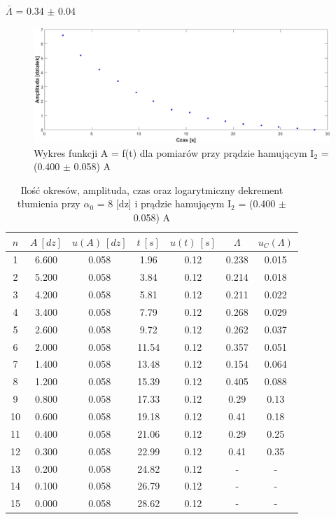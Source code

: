 \documentclass[12pt, a4paper, oneside]{article}
\begin{document}
\begin{center}
$\bar{\Lambda}$ = 0.34 $\pm$ 0.04
\end{center}
\clearpage
\begin{figure}[h]
\centering
\caption{Wykres funkcji A = f(t) dla pomiarów przy prądzie hamującym I$_2$ = (0.400 $\pm$ 0.058) A}
\includegraphics[scale=0.3]{f3.png}
\end{figure}
\begin{table}[h]
  \centering
  \caption{Ilość okresów, amplituda, czas oraz logarytmiczny dekrement tłumienia przy $\alpha_0$ = 8 [dz] i prądzie hamującym I$_2$ = (0.400 $\pm$ 0.058) A}
    \begin{tabular}{|c|c|c|c|c|c|c|}\hline
    $n$ & $A~[dz]$ & $u(A)~[dz]$ & $t~[s]$ & $u(t)~[s]$ & $\Lambda$ & $u_C(\Lambda)$ \\\hline
    1 & 6.600 & 0.058 & 1.96 & 0.12 & 0.238 & 0.015 \\\hline
    2 & 5.200 & 0.058 & 3.84 & 0.12 & 0.214 & 0.018 \\\hline
    3 & 4.200 & 0.058 & 5.81 & 0.12 & 0.211 & 0.022 \\\hline
    4 & 3.400 & 0.058 & 7.79 & 0.12 & 0.268 & 0.029 \\\hline
    5 & 2.600 & 0.058 & 9.72 & 0.12 & 0.262 & 0.037 \\\hline
    6 & 2.000 & 0.058 & 11.54 & 0.12 & 0.357 & 0.051 \\\hline
    7 & 1.400 & 0.058 & 13.48 & 0.12 & 0.154 & 0.064 \\\hline
    8 & 1.200 & 0.058 & 15.39 & 0.12 & 0.405 & 0.088 \\\hline
    9 & 0.800 & 0.058 & 17.33 & 0.12 & 0.29 & 0.13 \\\hline
    10 & 0.600 & 0.058 & 19.18 & 0.12 & 0.41 & 0.18 \\\hline
    11 & 0.400 & 0.058 & 21.06 & 0.12 & 0.29 & 0.25 \\\hline
    12 & 0.300 & 0.058 & 22.99 & 0.12 & 0.41 & 0.35 \\\hline
    13 & 0.200 & 0.058 & 24.82 & 0.12 & - & - \\\hline
    14 & 0.100 & 0.058 & 26.79 & 0.12 & - & - \\\hline
    15 & 0.000 & 0.058 & 28.62 & 0.12 & - & - \\\hline
    \end{tabular}%
  \label{tab:addlabel}%
\end{table}%
\end{document}
